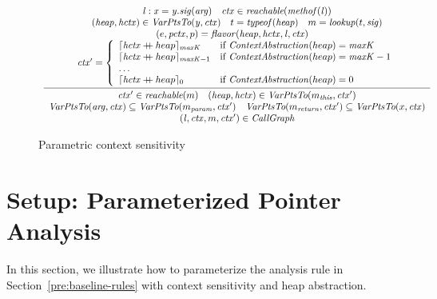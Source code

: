 

\begin{figure}[t]
	\[
	  \begin{array}{c}
		\infer[]
		{
		\begin{array}{c}
		  \ctx' \in \Reachable ({m}) \quad
		  ({\heap}, {\hctx}) \in  \VarPointsTo ({m_{\this}}, {\ctx'}) \\
		  \VarPointsTo({\it arg}, \ctx) \subseteq \VarPointsTo(m_{\it param}, \ctx')
		  \quad
		  \VarPointsTo(m_{\it return}, \ctx') \subseteq \VarPointsTo(x, \ctx)\\
		  (\invo, \ctx, m, \ctx') \in \CallGraph
		\end{array}
		}{
		\begin{array}{c}
		  {\it \invo : x = y.\sig({\it arg})} \quad
		  \ctx \in    \Reachable ({\methof(\invo)}) \\
		  ({\heap}, {\hctx})\in  \VarPointsTo ({\it y},\ctx) \quad
		  t = {\typeof}(\heap)  \quad m = {\lookup}(t, \sig) \\
  (e, {\pctx}, p) = \parent(\heap,\hctx, \invo, \ctx) \quad\\
  \ctx' = \left\{
	\begin{array}{l@{\quad}l}
	\truncateCtx{\appendCtx{{ \hctx}}{heap}}{\CallDepth}
	& \mbox{if}~\ctxAbstraction(heap) = \CallDepth \\
	\truncateCtx{\appendCtx{{ \hctx}}{heap}}{\CallDepth-1}     & \mbox{if}~\ctxAbstraction(heap) = \CallDepth-1\\
	\dots\\
	\truncateCtx{\appendCtx{{ \hctx}}{heap}}{0}
	& \mbox{if}~\ctxAbstraction(heap) = 0 \\
	\end{array}
	\right.
		\end{array}
															}
	  \end{array}
	\]
	\caption{Parametric context sensitivity}
  \label{fig:param-obj}
  \end{figure}


\section{Setup: Parameterized Pointer Analysis}\label{sec:graphick:param}

In this section, we illustrate how to parameterize the analysis rule in Section~\ref{pre:baseline-rules} with context sensitivity and heap abstraction.




